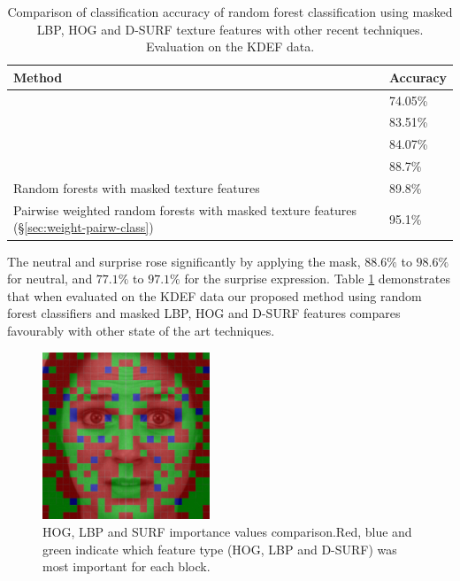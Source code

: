 \begin{table}[H]
	\centering
	\caption{Comparison of classification accuracy of random forest classification using masked LBP, HOG and D-SURF texture features with other recent techniques.  Evaluation on the KDEF data.}
	\label{table:us-vs-others}
	\begin{tabular}{@{}ll@{}}
		\toprule
		Method     \hspace{5.8cm}               & Accuracy   \tabularnewline   \midrule
		\cite{rao2015multi}                    & 74.05\%    \tabularnewline
		\cite{santra2016local}                 &  83.51\%   \tabularnewline
		\cite{santra2016saliency}              &  84.07\%  \tabularnewline 
		\cite{yuqian2016action}                & 88.7\%    \tabularnewline
		Random forests with masked texture features          & 89.8\%    \tabularnewline  
		Pairwise weighted random forests with masked texture features (\S \ref{sec:weight-pairw-class})         & 95.1\%    \tabularnewline  \bottomrule
		
	\end{tabular}
\end{table}

The neutral and surprise rose significantly by applying the mask, $88.6\%$  to $98.6\%$ for neutral, and  $77.1\%$  to $97.1\%$ for the surprise expression.
Table \ref{table:us-vs-others} demonstrates that when evaluated on the KDEF data our proposed method using random forest classifiers and masked LBP, HOG and D-SURF features compares favourably with other state of the art techniques.  



\begin{figure}[tb]
	\centering
	\includegraphics[width=50.0mm]{Chapter4/Figs/colours1.png}
	\caption{HOG, LBP and SURF importance values comparison.Red, blue and green indicate which feature type (HOG, LBP and D-SURF) was most important for each block. }
	\label{fig:impportColours}
\end{figure}







